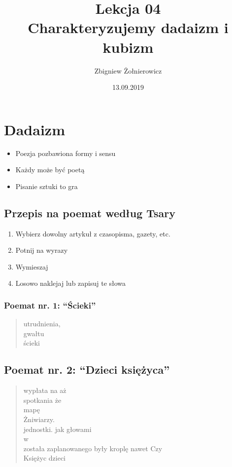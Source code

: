 \documentclass[a4paper]{article}
\begin{document}
\title{{\huge Lekcja 04} \\
{\large Charakteryzujemy dadaizm i kubizm}}
\author{Zbigniew Żołnierowicz}
\date{13.09.2019}
\maketitle
\section{Dadaizm}
\begin{itemize}
    \item Poezja pozbawiona formy i sensu
    \item Każdy może być poetą
    \item Pisanie sztuki to gra
\end{itemize}
\subsection{Przepis na poemat według Tsary}
\begin{enumerate}
    \item Wybierz dowolny artykuł z czasopisma, gazety, etc.
    \item Potnij na wyrazy
    \item Wymieszaj
    \item Losowo naklejaj lub zapisuj te słowa
\end{enumerate}
\subsubsection{Poemat nr. 1: ``Ścieki''}
\begin{quote}
utrudnienia, \\
gwałtu \\
ścieki \\
\end{quote}
\subsection{Poemat nr. 2: ``Dzieci księżyca''}
\begin{quote}
wypłata na aż \\
spotkania że \\
mapę \\
Żniwiarzy. \\
jednostki. jak głowami \\
w \\
została zaplanowanego były kroplę nawet Czy \\
Księżyc dzieci
\end{quote}
\pagebreak
\end{document}
